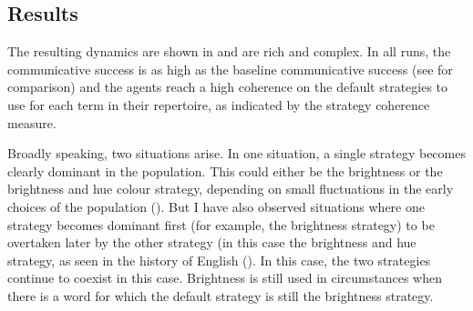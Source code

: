 \subsection{Results}

The resulting dynamics are shown in  and are
rich and complex. In all runs, the communicative success is as high as
the baseline communicative success (see  for comparison) and the agents reach a
high coherence on the default strategies to use for each term in their
repertoire, as indicated by the strategy coherence measure.

Broadly speaking, two situations arise. In one situation, a single
strategy becomes clearly dominant in the population. This could either
be the brightness or the brightness and hue colour strategy, depending
on small fluctuations in the early choices of the population (). But I have also observed situations where one
strategy becomes dominant first (for example, the brightness
  strategy) to be overtaken later by the other strategy (in this case
the brightness and hue strategy, as seen in the history of
English (). In this case, the two
strategies continue to coexist in this case. Brightness is still used
in circumstances when there is a word for which the default strategy
is still the brightness strategy.

